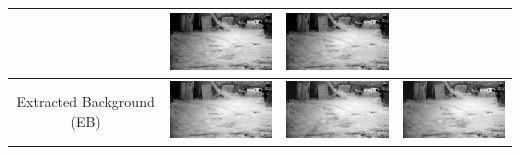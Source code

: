 \documentclass[11pt]{scrartcl} %
\theoremstyle{plain}
\begin{document}
\begin{minipage}{\linewidth}
\begin{tabular}{ | c | m{2.8cm} | m{2.8cm} | m{2.8cm} | }
\begin{minipage}{.3\textwidth}
    \end{minipage}
	&
    \begin{minipage}{.3\textwidth}
      \includegraphics[width=\linewidth, width=25mm]{figures_video/crow/background.png}
    \end{minipage}
    &
    \begin{minipage}{.3\textwidth}
      \includegraphics[width=\linewidth, width=25mm]{figures_video/crow/background.png}
    \end{minipage}
	\\ \hline
	
	Extracted Background (EB)
	&
    \begin{minipage}{.3\textwidth}
      \includegraphics[width=\linewidth, width=25mm]{figures_video/crow/rpca/lowRank_0_015.png}
    \end{minipage}	
	&
    \begin{minipage}{.3\textwidth}
      \includegraphics[width=\linewidth, width=25mm]{figures_video/crow/pca/lowRank_0.png}
    \end{minipage}
	&
    \begin{minipage}{.3\textwidth}
      \includegraphics[width=\linewidth, width=25mm]{figures_video/crow/pca2/lowRank_0.png}
    \end{minipage}
	\\ \hline
	

\end{tabular}
\end{minipage}
\end{document}
